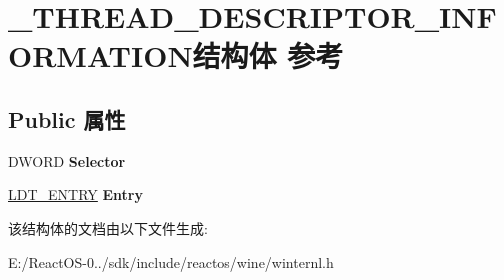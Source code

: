\hypertarget{struct___t_h_r_e_a_d___d_e_s_c_r_i_p_t_o_r___i_n_f_o_r_m_a_t_i_o_n}{}\section{\+\_\+\+T\+H\+R\+E\+A\+D\+\_\+\+D\+E\+S\+C\+R\+I\+P\+T\+O\+R\+\_\+\+I\+N\+F\+O\+R\+M\+A\+T\+I\+O\+N结构体 参考}
\label{struct___t_h_r_e_a_d___d_e_s_c_r_i_p_t_o_r___i_n_f_o_r_m_a_t_i_o_n}
\subsection*{Public 属性}
\begin{DoxyCompactItemize}
\item 
\mbox{\label{struct___t_h_r_e_a_d___d_e_s_c_r_i_p_t_o_r___i_n_f_o_r_m_a_t_i_o_n_ac2b090d39cf7a7810b418a5c804c7da9}} 
D\+W\+O\+RD {\bfseries Selector}
\item 
\mbox{\label{struct___t_h_r_e_a_d___d_e_s_c_r_i_p_t_o_r___i_n_f_o_r_m_a_t_i_o_n_acd98629c340c8de172defe9dfccb5c94}} 
\hyperlink{struct___l_d_t___e_n_t_r_y}{L\+D\+T\+\_\+\+E\+N\+T\+RY} {\bfseries Entry}
\end{DoxyCompactItemize}


该结构体的文档由以下文件生成\+:\begin{DoxyCompactItemize}
\item 
E\+:/\+React\+O\+S-\/0../sdk/include/reactos/wine/winternl.\+h\end{DoxyCompactItemize}
